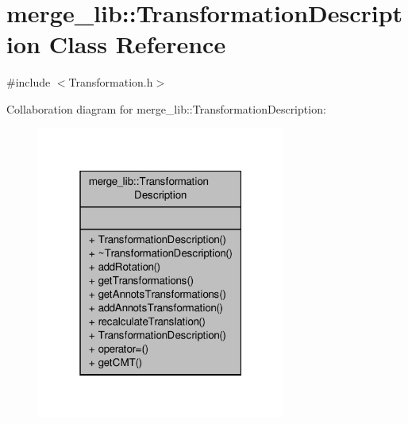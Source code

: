\hypertarget{classmerge__lib_1_1_transformation_description}{\section{merge\-\_\-lib\-:\-:Transformation\-Description Class Reference}
\label{df/d6f/classmerge__lib_1_1_transformation_description}
}


{\ttfamily \#include $<$Transformation.\-h$>$}



Collaboration diagram for merge\-\_\-lib\-:\-:Transformation\-Description\-:
\nopagebreak
\begin{figure}[H]
\begin{center}
\leavevmode
\includegraphics[width=232pt]{db/d20/classmerge__lib_1_1_transformation_description__coll__graph}
\end{center}
\end{figure}
